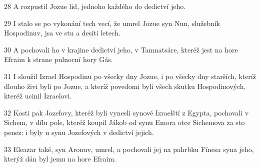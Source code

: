 \par 28 A rozpustil Jozue lid, jednoho každého do dedictví jeho.
\par 29 I stalo se po vykonání tech vecí, že umrel Jozue syn Nun, služebník Hospodinuv, jsa ve stu a desíti letech.
\par 30 A pochovali ho v krajine dedictví jeho, v Tamnatsáre, kteréž jest na hore Efraim k strane pulnocní hory Gás.
\par 31 I sloužil Izrael Hospodinu po všecky dny Jozue, i po všecky dny starších, kteríž dlouho živi byli po Jozue, a kteríž povedomi byli všech skutku Hospodinových, kteréž ucinil Izraelovi.
\par 32 Kosti pak Jozefovy, kteréž byli vynesli synové Izraelští z Egypta, pochovali v Sichem, v dílu pole, kteréž koupil Jákob od synu Emora otce Sichemova za sto penez; i byly u synu Jozefových v dedictví jejich.
\par 33 Eleazar také, syn Aronuv, umrel, a pochovali jej na pahrbku Fínesa syna jeho, kterýž dán byl jemu na hore Efraim.

